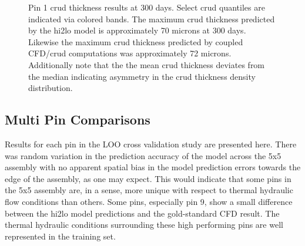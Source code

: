 \begin{figure}[H]%
    \centering
    \hspace*{-1.0em}%
    \caption[Pin 1 crud thickness results at 300 days]{Pin 1 crud thickness results at 300 days.  Select crud quantiles are indicated via colored bands.  The maximum crud thickness predicted by the hi2lo model is approximately 70 microns at 300 days.  Likewise the maximum crud thickness predicted by coupled CFD/crud computations was approximately 72 microns.  Additionally note that the the mean crud thickness deviates from the median indicating asymmetry in the crud thickness density distribution.}%
    \label{fig:dist_hi2loimppinzcthick}
\end{figure}


\subsection{Multi Pin Comparisons}
\label{sec:multi_pin_result}

Results for each pin in the LOO cross validation study are presented here.  There was random variation in the prediction accuracy of the model across the 5x5 assembly with no apparent spatial bias in the model prediction errors towards the edge of the assembly, as one may expect.  This would indicate that some pins in the 5x5 assembly are, in a sense, more unique with respect to thermal hydraulic flow conditions than others.  Some pins, especially pin 9, show a small difference between the hi2lo model predictions and the gold-standard CFD result.  The thermal hydraulic conditions surrounding these high performing pins are well represented in the training set.

